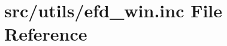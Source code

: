 \hypertarget{efd__win_8inc}{}\section{src/utils/efd\+\_\+win.inc File Reference}
\label{efd__win_8inc}

